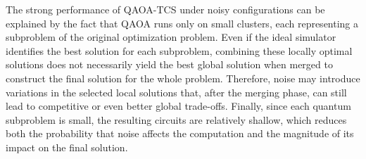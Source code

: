 
The strong performance of \textsc{QAOA-TCS} under noisy configurations can be explained by the fact that QAOA runs only on small clusters, each representing a subproblem of the original optimization problem. Even if the ideal simulator identifies the best solution for each subproblem, combining these locally optimal solutions does not necessarily yield the best global solution when merged to construct the final solution for the whole problem. Therefore, noise may introduce variations in the selected local solutions that, after the merging phase, can still lead to competitive or even better global trade-offs. Finally, since each quantum subproblem is small, the resulting circuits are relatively shallow, which reduces both the probability that noise affects the computation and the magnitude of its impact on the final solution.


